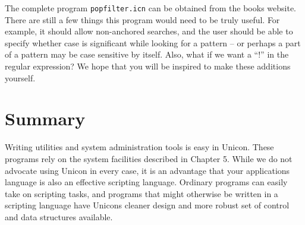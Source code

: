 The complete program \texttt{popfilter.icn} can be obtained from the
book{\textquotesingle}s website. There are still a few things this
program would need to be truly useful. For example, it should allow
non-anchored searches, and the user should be able to specify whether
case is significant while looking for a pattern -- or perhaps a
part of a pattern may be case sensitive by itself. Also, what if
we want a {\textquotedblleft}!{\textquotedblright} in the regular
expression? We hope that you will be inspired to make these
additions yourself.

\section*{Summary}

Writing utilities and system administration tools is easy in Unicon.
These programs rely on the system facilities described in
Chapter 5. While we do not advocate using Unicon in every case,
it is an advantage that your applications language is also an
effective scripting language. Ordinary programs can easily take on
scripting tasks, and programs that might otherwise be written in a
scripting language have Unicon{\textquotesingle}s cleaner design and
more robust set of control and data structures available.


\bigskip
